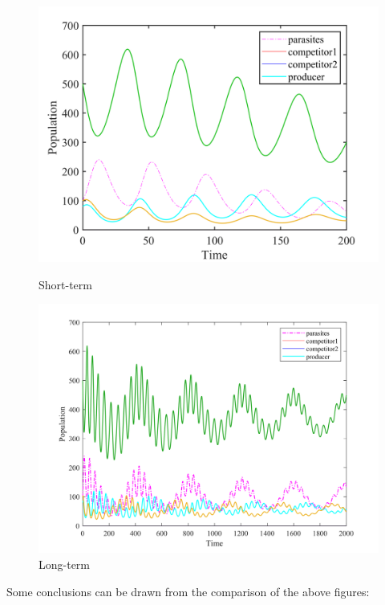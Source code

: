\documentclass[12pt]{article}  %
\begin{document}
\begin{figure}[htbp]
	\begin{minipage}[b]{0.5\linewidth}
		\centering
		\includegraphics[width=\linewidth]{img/competitor2.png}
		\caption{Short-term}
	\end{minipage}%
	\begin{minipage}[b]{0.5\linewidth}
		\centering
		\includegraphics[width=\linewidth]{img/competitor-17071240898223.png}
		\caption{Long-term}
	\end{minipage}
\end{figure}

\par
Some conclusions can be drawn from the comparison of the above figures:
\end{document}
